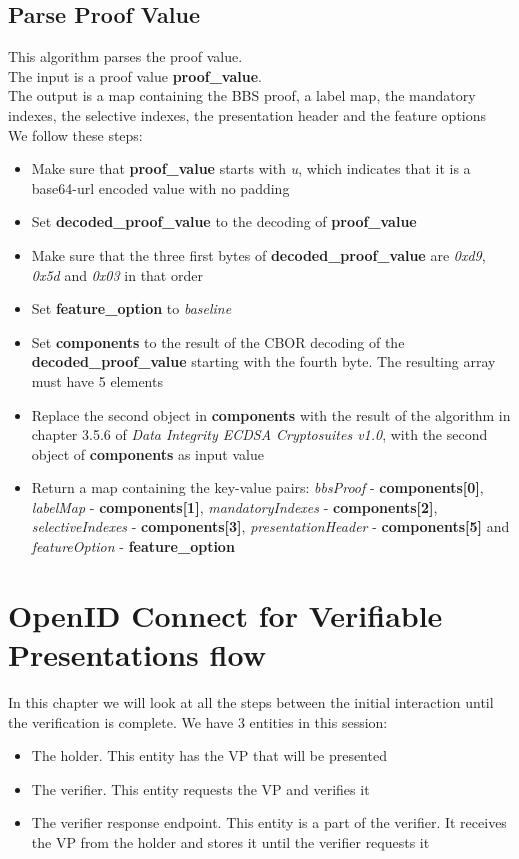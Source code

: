 \documentclass[
	a4paper               %
	,bibliography=totoc   %
	,listof=totoc         %
	,monolingual
]{bfhthesis}              %
\begin{document}
\section{Parse Proof Value}
\label{subsub:parseproof}
This algorithm parses the proof value.\\

The input is a proof value \textbf{proof\_value}.\\

The output is a map containing the BBS proof, a label map, the mandatory indexes, the selective indexes, the presentation header and the feature options\\

We follow these steps:
\begin{itemize}
	\item Make sure that \textbf{proof\_value} starts with \textit{u}, which indicates that it is a base64-url encoded value with no padding
	\item Set \textbf{decoded\_proof\_value} to the decoding of \textbf{proof\_value}
	\item Make sure that the three first bytes of \textbf{decoded\_proof\_value} are \textit{0xd9}, \textit{0x5d} and \textit{0x03} in that order
	\item Set \textbf{feature\_option} to \textit{baseline}
	\item Set \textbf{components} to the result of the CBOR decoding of the \textbf{decoded\_proof\_value} starting with the fourth byte. The resulting array must have 5 elements
	\item Replace the second object in \textbf{components} with the result of the algorithm in chapter 3.5.6 of \textit{Data Integrity ECDSA Cryptosuites v1.0}\cite{ecdsa}, with the second object of \textbf{components} as input value
	\item Return a map containing the key-value pairs: \textit{bbsProof} - \textbf{components[0]}, \textit{labelMap} - \textbf{components[1]}, \textit{mandatoryIndexes} - \textbf{components[2]}, \textit{selectiveIndexes} - \textbf{components[3]}, \textit{presentationHeader} - \textbf{components[5]} and \textit{featureOption} - \textbf{feature\_option}
\end{itemize}


\chapter{OpenID Connect for Verifiable Presentations flow}
In this chapter we will look at all the steps between the initial interaction until the verification is complete.
We have 3 entities in this session:
\begin{itemize}
	\item The holder. This entity has the VP that will be presented
	\item The verifier. This entity requests the VP and verifies it
	\item The verifier response endpoint. This entity is a part of the verifier. It receives the VP from the holder and stores it until the verifier requests it
\end{itemize}
\end{document}
